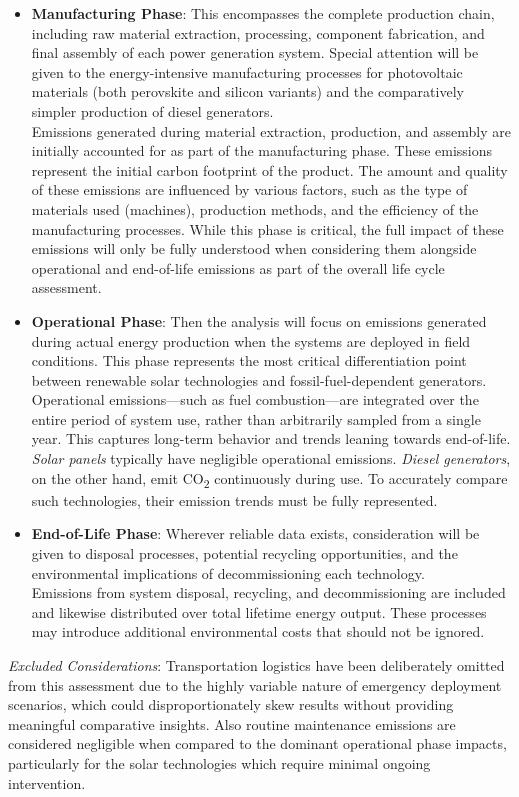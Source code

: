 \documentclass{article}
\begin{document}
\begin{itemize}
	\item \textbf{Manufacturing Phase}: This encompasses the complete production chain, including raw material extraction, processing, component fabrication, and final assembly of each power generation system. Special attention will be given to the energy-intensive manufacturing processes for photovoltaic materials (both perovskite and silicon variants) and the comparatively simpler production of diesel generators.\\[8pt]
	Emissions generated during material extraction, production, and assembly are initially accounted for as part of the manufacturing phase. These emissions represent the initial carbon footprint of the product. The amount and quality of these emissions are influenced by various factors, such as the type of materials used (machines), production methods, and the efficiency of the manufacturing processes. While this phase is critical, the full impact of these emissions will only be fully understood when considering them alongside operational and end-of-life emissions as part of the overall life cycle assessment.
	\item \textbf{Operational Phase}: Then the analysis will focus on emissions generated during actual energy production when the systems are deployed in field conditions. This phase represents the most critical differentiation point between renewable solar technologies and fossil-fuel-dependent generators.\\[8pt]
	Operational emissions—such as fuel combustion—are integrated over the entire period of system use, rather than arbitrarily sampled from a single year. This captures long-term behavior and trends leaning towards end-of-life.\\[8pt]	
	\textit{Solar panels} typically have negligible operational emissions. \textit{Diesel generators}, on the other hand, emit CO\textsubscript{2} continuously during use. To accurately compare such technologies, their emission trends must be fully represented.  
	\item \textbf{End-of-Life Phase}: Wherever reliable data exists, consideration will be given to disposal processes, potential recycling opportunities, and the environmental implications of decommissioning each technology.\\[8pt]
	Emissions from system disposal, recycling, and decommissioning are included and likewise distributed over total lifetime energy output. These processes may introduce additional environmental costs that should not be ignored.
\end{itemize}
\textit{Excluded Considerations}: Transportation logistics have been deliberately omitted from this assessment due to the highly variable nature of emergency deployment scenarios, which could disproportionately skew results without providing meaningful comparative insights. Also routine maintenance emissions are considered negligible when compared to the dominant operational phase impacts, particularly for the solar technologies which require minimal ongoing intervention.
\end{document}
